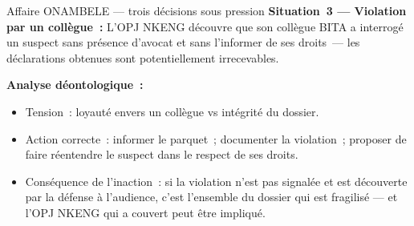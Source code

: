 \begin{boxscenario}{Affaire ONAMBELE --- trois décisions sous pression}
\textbf{Situation~3 --- Violation par un collègue~:}
L'OPJ NKENG découvre que son collègue BITA a interrogé un suspect sans
présence d'avocat et sans l'informer de ses droits~--- les déclarations
obtenues sont potentiellement irrecevables.

\textbf{Analyse déontologique~:}
\begin{itemize}
    \item Tension~: loyauté envers un collègue vs intégrité du dossier.
    \item Action correcte~: informer le parquet~; documenter la violation~;
          proposer de faire réentendre le suspect dans le respect de
          ses droits.
    \item Conséquence de l'inaction~: si la violation n'est pas signalée
          et est découverte par la défense à l'audience, c'est
          l'ensemble du dossier qui est fragilisé --- et l'OPJ NKENG
          qui a couvert peut être impliqué.
\end{itemize}
\end{boxscenario}

\separateur

